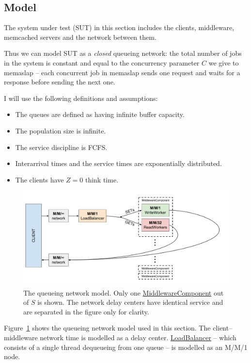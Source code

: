 \documentclass[11pt]{article}
\newcommand{\todo}[1]{\fcolorbox{black}{Apricot}{TODO: #1}}
\newcommand{\linkmain}[1]{\href{https://gitlab.inf.ethz.ch/pungast/asl-fall16-project/blob/master/src/main/java/asl/#1.java}{#1}}
\begin{document}
\subsection{Model}
\todo{}

The system under test (SUT) in this section includes the clients, middleware, memcached servers and the network between them.

Thus we can model SUT as a \emph{closed} queueing network: the total number of jobs in the system is constant and equal to the concurrency parameter $C$ we give to memaslap -- each concurrent job in memaslap sends one request and waits for a response before sending the next one.

I will use the following definitions and assumptions:
\begin{itemize}
	\item The queues are defined as having infinite buffer capacity.
	\item The population size is infinite.
	\item The service discipline is FCFS.
	\item Interarrival times and the service times are exponentially distributed.
	\item The clients have $Z=0$ think time.
\end{itemize}

\begin{figure}[h]
\centering
\includegraphics[width=\textwidth]{figures/queueing_network}
\caption{The queueing network model. Only one \linkmain{MiddlewareComponent} out of $S$ is shown. The network delay centers have identical service and are separated in the figure only for clarity.}
\label{fig:part3:network_diagram}
\end{figure}

Figure~\ref{fig:part3:network_diagram} shows the queueing network model used in this section. The client--middleware network time is modelled as a delay center. \linkmain{LoadBalancer} -- which consists of a single thread dequeueing from one queue -- is modelled as an M/M/1 node.
\end{document}
